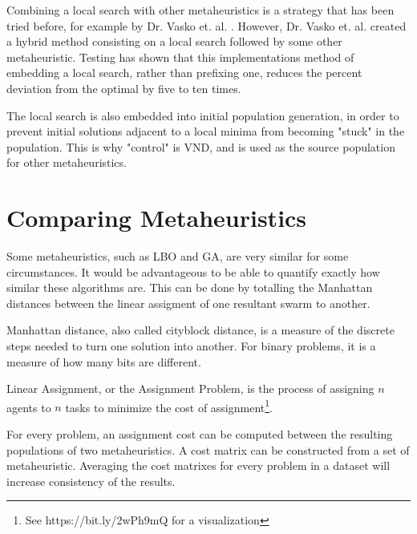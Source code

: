 \documentclass[11pt, letterpaper, onecolumn]{article}
\begin{document}
\begin{table}[htbp]
\end{table}

Combining a local search with other metaheuristics is a strategy that has been tried before, for example by Dr. Vasko et. al. \cite{mmkp}. However, Dr. Vasko et. al. created a hybrid method consisting on a local search followed by some other metaheuristic. Testing has shown that this implementations method of embedding a local search, rather than prefixing one, reduces the percent deviation from the optimal by five to ten times. 

The local search is also embedded into initial population generation, in order to prevent initial solutions adjacent to a local minima from becoming "stuck" in the population. This is why "control" is VND, and is used as the source population for other metaheuristics. 

\section{Comparing Metaheuristics} \label{compare}

Some metaheuristics, such as LBO and GA, are very similar for some circumstances. It would be advantageous to be able to quantify exactly how similar these algorithms are. This can be done by totalling the Manhattan distances between the linear assigment of one resultant swarm to another. 

Manhattan distance, also called cityblock distance, is a measure of the discrete steps needed to turn one solution into another. For binary problems, it is a measure of how many bits are different. 

Linear Assignment, or the Assignment Problem, is the process of assigning $n$ agents to $n$ tasks to minimize the cost of assignment\footnote{See https://bit.ly/2wPh9mQ for a visualization}. 

For every problem, an assignment cost can be computed between the resulting populations of two metaheuristics. A cost matrix can be constructed from a set of metaheuristic. Averaging the cost matrixes for every problem in a dataset will increase consistency of the results. 


\end{document}
